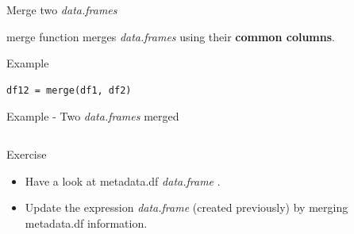 \documentclass[10pt]{beamer}
\newcommand{\df}{{\it data.frame} }
\newcommand{\dfs}{{\it data.frames} }
\begin{document}
\begin{frame}[fragile,shrink=5]{Merge two \dfs}
  \begin{block}{}
    {\sf merge} function merges \dfs using their {\bf common columns}.
  \end{block}
  \begin{exampleblock}{Example}
\begin{verbatim}
df12 = merge(df1, df2)
\end{verbatim}
  \end{exampleblock}
  \begin{block}{Example - Two \dfs merged}
    \begin{columns}
      \begin{column}{.3\textwidth}
        \centering
        \bigskip
      \end{column}
      \begin{column}{.6\textwidth}
        \centering
      \end{column}
    \end{columns}
  \end{block}
  \begin{alertblock}{Exercise}
    \begin{itemize}
    \item Have a look at {\sf metadata.df} \df.
    \item Update the expression \df (created previously) by merging {\sf metadata.df} information.
    \end{itemize}
  \end{alertblock}
\end{frame}
\end{document}
